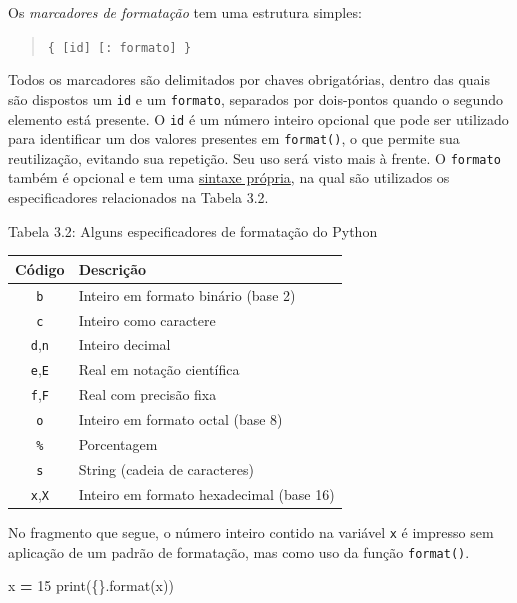 \documentclass[
]{book}
\newenvironment{Shaded}{\begin{snugshade}}{\end{snugshade}}
\newcommand{\BuiltInTok}[1]{#1}
\newcommand{\DecValTok}[1]{\textcolor[rgb]{0.00,0.00,0.81}{#1}}
\newcommand{\NormalTok}[1]{#1}
\newcommand{\OperatorTok}[1]{\textcolor[rgb]{0.81,0.36,0.00}{\textbf{#1}}}
\newcommand{\SpecialCharTok}[1]{\textcolor[rgb]{0.00,0.00,0.00}{#1}}
\newcommand{\StringTok}[1]{\textcolor[rgb]{0.31,0.60,0.02}{#1}}
\begin{document}
Os \emph{marcadores de formatação} tem uma estrutura simples:

\begin{quote}
\texttt{\{\ {[}id{]}\ {[}:\ formato{]}\ \}}
\end{quote}

Todos os marcadores são delimitados por chaves obrigatórias, dentro das quais são dispostos um \texttt{id} e um \texttt{formato}, separados por dois-pontos quando o segundo elemento está presente. O \texttt{id} é um número inteiro opcional que pode ser utilizado para identificar um dos valores presentes em \texttt{format()}, o que permite sua reutilização, evitando sua repetição. Seu uso será visto mais à frente. O \texttt{formato} também é opcional e tem uma \href{https://docs.python.org/3/library/string.html\#formatspec}{sintaxe própria}, na qual são utilizados os especificadores relacionados na Tabela 3.2.

Tabela 3.2: Alguns especificadores de formatação do Python

\begin{longtable}[]{@{}cl@{}}
\toprule
Código & Descrição \\
\midrule
\endhead
\texttt{b} & Inteiro em formato binário (base 2) \\
\texttt{c} & Inteiro como caractere \\
\texttt{d},\texttt{n} & Inteiro decimal \\
\texttt{e},\texttt{E} & Real em notação científica \\
\texttt{f},\texttt{F} & Real com precisão fixa \\
\texttt{o} & Inteiro em formato octal (base 8) \\
\texttt{\%} & Porcentagem \\
\texttt{s} & String (cadeia de caracteres) \\
\texttt{x},\texttt{X} & Inteiro em formato hexadecimal (base 16) \\
\bottomrule
\end{longtable}

No fragmento que segue, o número inteiro contido na variável \texttt{x} é impresso sem aplicação de um padrão de formatação, mas como uso da função \texttt{format()}.

\begin{Shaded}
\begin{Highlighting}[]
\NormalTok{x }\OperatorTok{=} \DecValTok{15}
\BuiltInTok{print}\NormalTok{(}\StringTok{\textquotesingle{}}\SpecialCharTok{\{\}}\StringTok{\textquotesingle{}}\NormalTok{.}\BuiltInTok{format}\NormalTok{(x))}
\end{Highlighting}
\end{Shaded}
\end{document}
